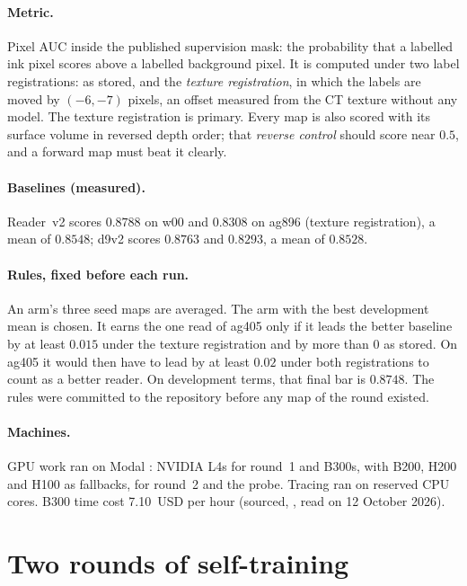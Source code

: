 \documentclass[11pt]{article}
\begin{document}
\paragraph{Metric.} Pixel AUC inside the published supervision mask: the probability that a labelled ink pixel scores above a labelled background pixel. It is computed under two label registrations: as stored, and the \emph{texture registration}, in which the labels are moved by $(-6, -7)$ pixels, an offset measured from the CT texture without any model. The texture registration is primary. Every map is also scored with its surface volume in reversed depth order; that \emph{reverse control} should score near $0.5$, and a forward map must beat it clearly.

\paragraph{Baselines (measured).} Reader~v2 scores $0.8788$ on w00 and $0.8308$ on ag896 (texture registration), a mean of $0.8548$; d9v2 scores $0.8763$ and $0.8293$, a mean of $0.8528$.

\paragraph{Rules, fixed before each run.} An arm's three seed maps are averaged. The arm with the best development mean is chosen. It earns the one read of ag405 only if it leads the better baseline by at least $0.015$ under the texture registration and by more than $0$ as stored. On ag405 it would then have to lead by at least $0.02$ under both registrations to count as a better reader. On development terms, that final bar is $0.8748$. The rules were committed to the repository before any map of the round existed.

\paragraph{Machines.} GPU work ran on Modal \cite{modalpricing}: NVIDIA L4s for round~1 and B300s, with B200, H200 and H100 as fallbacks, for round~2 and the probe. Tracing ran on reserved CPU cores. B300 time cost 7.10~USD per hour (sourced, \cite{modalpricing}, read on 12 October 2026).

\section{Two rounds of self-training}\label{sec:ink}
\end{document}
